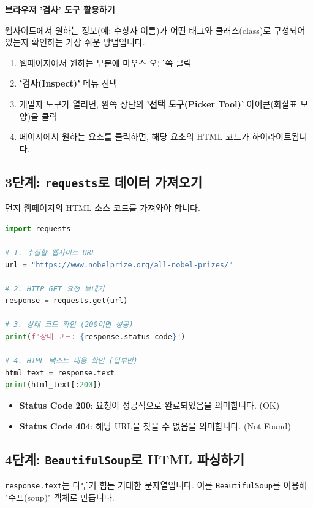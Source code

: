 \documentclass[11pt,a4paper]{book}
\theoremstyle{definition}
\begin{document}
\begin{examplebox}
\textbf{브라우저 '검사' 도구 활용하기}

웹사이트에서 원하는 정보(예: 수상자 이름)가 어떤 태그와 클래스(class)로 구성되어 있는지 확인하는 가장 쉬운 방법입니다.
\begin{enumerate}
    \item 웹페이지에서 원하는 부분에 마우스 오른쪽 클릭
    \item \textbf{'검사(Inspect)'} 메뉴 선택
    \item 개발자 도구가 열리면, 왼쪽 상단의 \textbf{'선택 도구(Picker Tool)'} 아이콘(화살표 모양)을 클릭
    \item 페이지에서 원하는 요소를 클릭하면, 해당 요소의 HTML 코드가 하이라이트됩니다.
\end{enumerate}
\end{examplebox}

\subsection{3단계: \texttt{requests}로 데이터 가져오기}
먼저 웹페이지의 HTML 소스 코드를 가져와야 합니다.

\begin{lstlisting}[language=Python, caption={requests를 사용한 HTML 코드 요청}, label={code:requests}, breaklines=true]
import requests

# 1. 수집할 웹사이트 URL
url = "https://www.nobelprize.org/all-nobel-prizes/"

# 2. HTTP GET 요청 보내기
response = requests.get(url)

# 3. 상태 코드 확인 (200이면 성공)
print(f"상태 코드: {response.status_code}")

# 4. HTML 텍스트 내용 확인 (일부만)
html_text = response.text
print(html_text[:200])
\end{lstlisting}

\begin{itemize}
    \item \textbf{Status Code 200}: 요청이 성공적으로 완료되었음을 의미합니다. (OK)
    \item \textbf{Status Code 404}: 해당 URL을 찾을 수 없음을 의미합니다. (Not Found)
\end{itemize}

\subsection{4단계: \texttt{BeautifulSoup}로 HTML 파싱하기}
\texttt{response.text}는 다루기 힘든 거대한 문자열입니다. 이를 \texttt{BeautifulSoup}를 이용해 "수프(soup)" 객체로 만듭니다.
\end{document}
